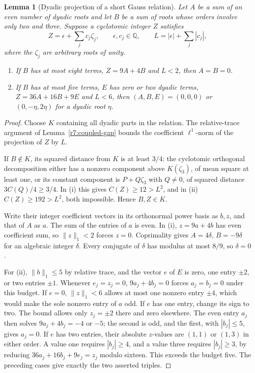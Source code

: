 \documentclass[11pt]{amsart}
\numberwithin{equation}{section}
\newtheorem{lemma}[theorem]{Lemma}
\theoremstyle{definition}
\theoremstyle{plain}
\begin{document}
\begin{lemma}[Dyadic projection of a short Gauss relation]\label{r7:gauss-projection}
Let $A$ be a sum of an even number of dyadic roots and let $B$ be a sum of roots whose orders involve only two and three. Suppose a cyclotomic integer $Z$ satisfies
\[
 Z=\epsilon+\sum_j c_j\zeta_j,\qquad
 \epsilon,c_j\in\mathbb Q,\qquad L=|\epsilon|+\sum_j|c_j|,
\]
where the $\zeta_j$ are arbitrary roots of unity.
\begin{enumerate}[label=\textup{(\roman*)}]
\item If $B$ has at most eight terms, $Z=9A+4B$ and $L<2$, then $A=B=0$.
\item If $B$ has at most five terms, $E$ has zero or two dyadic terms, $Z=36A+16B+9E$ and $L<6$, then $(A,B,E)=(0,0,0)$ or $(0,-\eta,2\eta)$ for a dyadic root $\eta$.
\end{enumerate}
\end{lemma}
\begin{proof}
Choose $K$ containing all dyadic parts in the relation. The relative-trace argument of Lemma~\ref{r7:coupled-gap} bounds the coefficient $\ell^1$-norm of the projection of $Z$ by $L$.

If $B\notin K$, its squared distance from $K$ is at least $3/4$: the cyclotomic orthogonal decomposition \cite[Lemma~5.2.1]{CMSCyclotomic} either has a nonzero component above $K(\zeta_3)$, of mean square at least one, or its constant component is $P+Q\zeta_3$ with $Q\ne0$, of squared distance $3C(Q)/4\ge3/4$. In (i) this gives $C(Z)\ge12>L^2$, and in (ii) $C(Z)\ge192>L^2$, both impossible. Hence $B,Z\in K$.

Write their integer coefficient vectors in its orthonormal power basis as $b,z$, and that of $A$ as $a$. The sum of the entries of $a$ is even. In (i), $z=9a+4b$ has even coefficient sum, so $\|z\|_1<2$ forces $z=0$. Coprimality gives $A=4\delta$, $B=-9\delta$ for an algebraic integer $\delta$. Every conjugate of $\delta$ has modulus at most $8/9$, so $\delta=0$.

For (ii), $\|b\|_1\le5$ by relative trace, and the vector $e$ of $E$ is zero, one entry $\pm2$, or two entries $\pm1$. Whenever $e_j=z_j=0$, $9a_j+4b_j=0$ forces $a_j=b_j=0$ under this budget. If $e=0$, $\|z\|_1<6$ allows at most one nonzero entry $\pm4$, which would make the sole nonzero entry of $a$ odd. If $e$ has one entry, change its sign to two. The bound allows only $z_j=\pm2$ there and zero elsewhere. The even entry $a_j$ then solves $9a_j+4b_j=-4$ or $-5$; the second is odd, and the first, with $|b_j|\le5$, gives $a_j=0$. If $e$ has two entries, their absolute $z$-values are $(1,1)$ or $(1,3)$ in either order. A value one requires $|b_j|\ge4$, and a value three requires $|b_j|\ge3$, by reducing $36a_j+16b_j+9e_j=z_j$ modulo sixteen. This exceeds the budget five. The preceding cases give exactly the two asserted triples.
\end{proof}
\end{document}
